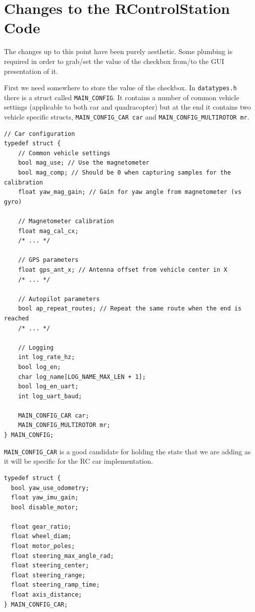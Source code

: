 \documentclass[12pt]{article} %
\begin{document}
\section{Changes to the RControlStation Code}
The changes up to this point have been purely aesthetic. Some plumbing
is required in order to grab/set the value of the checkbox from/to the
GUI presentation of it.

First we need somewhere to store the value of the checkbox. In
{\verb!datatypes.h!} there is a struct called {\verb!MAIN_CONFIG!}.
It contains a number of common vehicle settings (applicable to both
car and quadracopter) but at the end it contains two vehicle specific
structs, {\verb!MAIN_CONFIG_CAR car!} and {\verb!MAIN_CONFIG_MULTIROTOR mr!}.

\begin{Verbatim}[samepage=true,frame=single,label=Linux/RControlStation/datatypes.h]
// Car configuration
typedef struct {
    // Common vehicle settings
    bool mag_use; // Use the magnetometer
    bool mag_comp; // Should be 0 when capturing samples for the calibration
    float yaw_mag_gain; // Gain for yaw angle from magnetometer (vs gyro)

    // Magnetometer calibration
    float mag_cal_cx;
    /* ... */

    // GPS parameters
    float gps_ant_x; // Antenna offset from vehicle center in X
    /* ... */
    
    // Autopilot parameters
    bool ap_repeat_routes; // Repeat the same route when the end is reached
    /* ... */ 
    
    // Logging
    int log_rate_hz;
    bool log_en;
    char log_name[LOG_NAME_MAX_LEN + 1];
    bool log_en_uart;
    int log_uart_baud;

    MAIN_CONFIG_CAR car;
    MAIN_CONFIG_MULTIROTOR mr;
} MAIN_CONFIG;
\end{Verbatim}

{\verb!MAIN_CONFIG_CAR!} is a good candidate for holding the state that
we are adding as it will be specific for the RC car implementation. 

\begin{Verbatim}[samepage=true,frame=single,label=Linux/RControlStation/datatypes.h]
typedef struct {
  bool yaw_use_odometry; 
  float yaw_imu_gain; 
  bool disable_motor;

  float gear_ratio;
  float wheel_diam;
  float motor_poles;
  float steering_max_angle_rad;
  float steering_center;
  float steering_range;
  float steering_ramp_time; 
  float axis_distance;
} MAIN_CONFIG_CAR;
\end{Verbatim}
\end{document}
